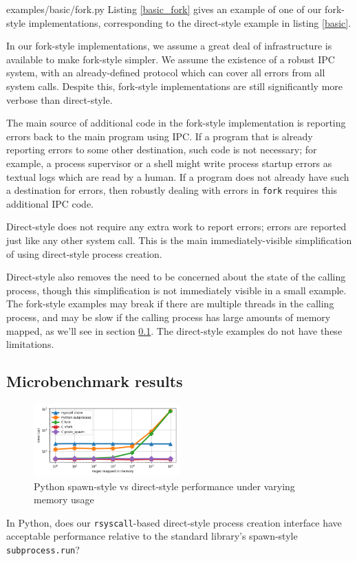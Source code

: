 \documentclass[letterpaper,twocolumn,10pt]{article}
\begin{document}

{examples/basic/fork.py}
Listing \ref{basic_fork} gives an example of one of our fork-style implementations,
corresponding to the direct-style example in listing \ref{basic}.

In our fork-style implementations,
we assume a great deal of infrastructure is available to make fork-style simpler.
We assume the existence of a robust IPC system,
with an already-defined protocol which can cover all errors from all system calls.
Despite this, fork-style implementations are still significantly more verbose than direct-style.

The main source of additional code in the fork-style implementation
is reporting errors back to the main program using IPC.
If a program that is already reporting errors to some other destination,
such code is not necessary;
for example, a process supervisor or a shell might write process startup errors
as textual logs which are read by a human.
If a program does not already have such a destination for errors,
then robustly dealing with errors in \texttt{fork} requires this additional IPC code.

Direct-style does not require any extra work to report errors;
errors are reported just like any other system call.
This is the main immediately-visible simplification of using direct-style process creation.

Direct-style also removes the need to be concerned about the state of the calling process,
though this simplification is not immediately visible in a small example.
The fork-style examples may break if there are multiple threads in the calling process,
and may be slow if the calling process has large amounts of memory mapped, as we'll see in section \ref{subprocess_bench}.
The direct-style examples do not have these limitations.
\subsection{Microbenchmark results}\label{subprocess_bench}
\begin{figure}[h!]
\centering
 \includegraphics[width=0.5\textwidth]{subprocess_bench}
 \caption{Python spawn-style vs direct-style performance under varying memory usage}
 \label{fig:subprocess_bench}
\end{figure}
In Python, does our \texttt{rsyscall}-based direct-style process creation interface
have acceptable performance relative to the standard library's spawn-style \texttt{subprocess.run}?
\end{document}

